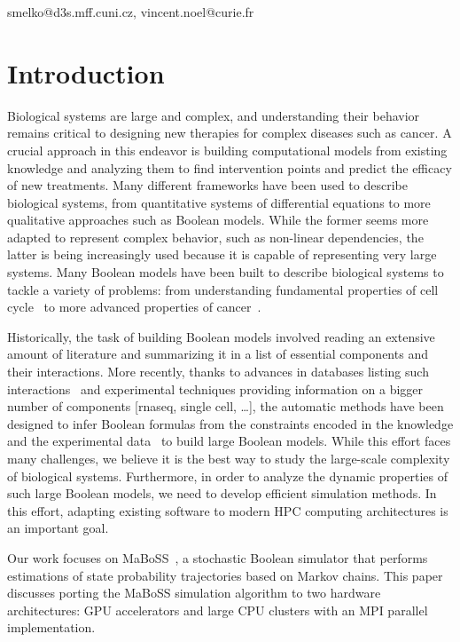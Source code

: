 \documentclass[times, twoside]{zHenriquesLab-StyleBioRxiv}
\begin{document}
\begin{corrauthor}
smelko@d3s.mff.cuni.cz, vincent.noel@curie.fr
\end{corrauthor}
\section*{Introduction}
Biological systems are large and complex, and understanding their behavior remains critical to designing new therapies for complex diseases such as cancer. A crucial approach in this endeavor is building computational models from existing knowledge and analyzing them to find intervention points and predict the efficacy of new treatments.
Many different frameworks have been used to describe biological systems, from quantitative systems of differential equations to more qualitative approaches such as Boolean models. While the former seems more adapted to represent complex behavior, such as non-linear dependencies, the latter is being increasingly used because it is capable of representing very large systems.
Many Boolean models have been built to describe biological systems to tackle a variety of problems: from understanding fundamental properties of cell cycle~\cite{faure2006cellcycle,sizek2019boolean} to more advanced properties of cancer~\cite{montagud2022prostate}.

Historically, the task of building Boolean models involved reading an extensive amount of literature and summarizing it in a list of essential components and their interactions. More recently, thanks to advances in databases listing such interactions~\cite{licata2020signor,turei2016omnipath} and experimental techniques providing information on a bigger number of components [rnaseq, single cell, …], the automatic methods have been designed to infer Boolean formulas from the constraints encoded in the knowledge and the experimental data~\cite{chevalier2020synthesis,benevs2023boolean} to build large Boolean models. While this effort faces many challenges, we believe it is the best way to study the large-scale complexity of biological systems. Furthermore, in order to analyze the dynamic properties of such large Boolean models, we need to develop efficient simulation methods. In this effort, adapting existing software to modern HPC computing architectures is an important goal. 

Our work focuses on MaBoSS~\cite{stoll2012continuous, stoll2017maboss}, a stochastic Boolean simulator that performs estimations of state probability trajectories based on Markov chains. 
This paper discusses porting the MaBoSS simulation algorithm to two hardware architectures: GPU accelerators and large CPU clusters with an MPI parallel implementation.
\end{document}
